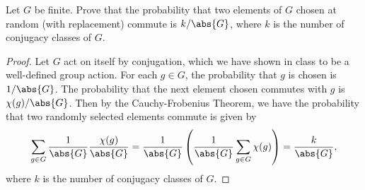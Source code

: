 \documentclass[10pt]{amsart}
\begin{document}
\begin{thm}
  Let $G$ be finite.
  Prove that the probability that two elements of $G$ chosen at random (with replacement) commute is $k/\abs{G}$, where $k$ is the number of conjugacy classes of $G$.
  \begin{proof}
    Let $G$ act on itself by conjugation, which we have shown in class to be a well-defined group action.
    For each $g \in G$, the probability that $g$ is chosen is $1/\abs{G}$.
    The probability that the next element chosen commutes with $g$ is $\chi(g)/\abs{G}$.
    Then by the Cauchy-Frobenius Theorem, we have the probability that two randomly selected elements commute is given by 
    $$\sum_{g \in G} \frac{1}{\abs{G}} \frac{\chi(g)}{\abs{G}} = \frac{1}{\abs{G}} \left(\frac{1}{\abs{G}} \sum_{g \in G} \chi(g) \right) = \frac{k}{\abs{G}},$$
    where $k$ is the number of conjugacy classes of $G$.
  \end{proof}
\end{thm}
\end{document}
